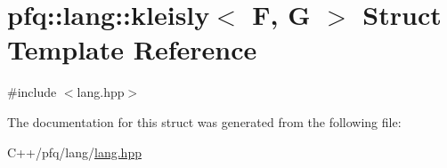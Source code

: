 \hypertarget{structpfq_1_1lang_1_1kleisly}{}\section{pfq\+:\+:lang\+:\+:kleisly$<$ F, G $>$ Struct Template Reference}
\label{structpfq_1_1lang_1_1kleisly}


{\ttfamily \#include $<$lang.\+hpp$>$}



The documentation for this struct was generated from the following file\+:\begin{DoxyCompactItemize}
\item 
C++/pfq/lang/\hyperlink{lang_8hpp}{lang.\+hpp}\end{DoxyCompactItemize}

